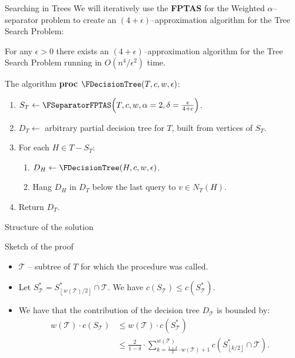 \documentclass{beamer}
\newcommand{\br}[1]{\mathopen{}\left( #1 \right)}
\newcommand{\fl}[1]{\mathopen{}\left\lfloor #1 \right\rfloor}
\begin{document}
\begin{frame}{Searching in Trees}
We will iteratively use the \textbf{FPTAS} for the Weighted $\alpha$–separator problem to create an $\br{4+\epsilon}$–approximation algorithm for the Tree Search Problem:
\begin{theorem}
    For any $\epsilon>0$ there exists an $\br{4+\epsilon}$–approximation algorithm for the Tree Search Problem running in $O\br{n^4/\epsilon^2}$ time.
\end{theorem}
    
\end{frame}

\begin{frame}{The algorithm}
\textbf{proc} $\FDecisionTree\br{T,c,w,\epsilon}$:
\begin{enumerate}
    \item $S_T\gets\FSeparatorFPTAS\br{T, c, w, \alpha=2, \delta = \frac{\epsilon}{4+\epsilon}}$.
    \item $D_T\gets$ arbitrary partial decision tree for $T$, built from vertices of $S_T$.
    \item For each $H\in T-S_T$:
    \begin{enumerate}
        \item $D_H\gets\FDecisionTree\br{H,c,w,\epsilon}$.
        \item Hang $D_H$ in $D_T$ below the last query to $v\in N_T\br{H}$.
    \end{enumerate}
    \item Return $D_T$.
\end{enumerate}
\end{frame}

\begin{frame}{Structure of the solution}

\end{frame}

%     

\begin{frame}{Sketch of the proof}
\begin{itemize}
    \item $\mathcal{T}$ – subtree of $T$ for which the procedure was called.
    \item Let $S_{\mathcal{T}}^*=S_{\fl{w\br{\mathcal{T}}/2}}^*\cap\mathcal{T}$. We have $c\br{S_{\mathcal{T}}}\leq c\br{S_{\mathcal{T}}^*}$.
    \item We have that the contribution of the decision tree $D_{\mathcal{T}}$ is bounded by:
    \pause
            \begin{align*}
                w\br{\mathcal{T}}\cdot c\br{S_{\mathcal{T}}}
                &\leq w\br{\mathcal{T}}\cdot c\br{S_{\mathcal{T}}^*} 
                \\&\leq 
                \frac{2}{1-\delta}\cdot \sum_{k=\frac{1+\delta}{2}\cdot w\br{\mathcal{T}}+1}^{w\br{\mathcal{T}}}c\br{S_{\fl{k/2}}^*\cap \mathcal{T}}.
            \end{align*}
    \end{itemize} 
\end{frame}
\end{document}
